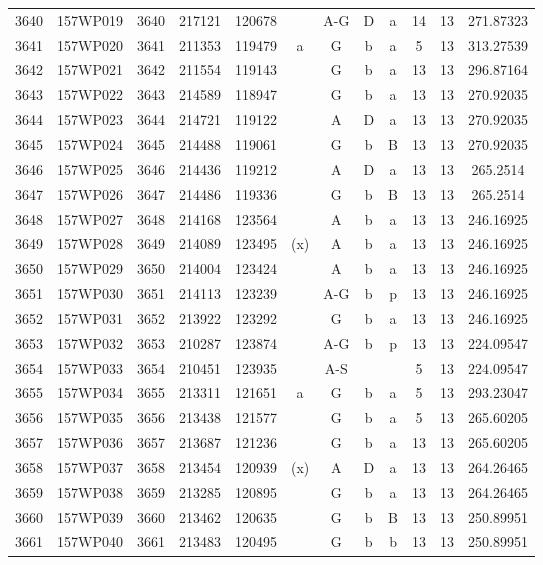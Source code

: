 \begin{tabular}{|*{12}{c|}}
3640 & 157WP019 & 3640 & 217121 & 120678 &  & A-G & D & a & 14 & 13 & 271.87323 \\ 
3641 & 157WP020 & 3641 & 211353 & 119479 & a & G & b & a & 5 & 13 & 313.27539 \\ 
3642 & 157WP021 & 3642 & 211554 & 119143 &  & G & b & a & 13 & 13 & 296.87164 \\ 
3643 & 157WP022 & 3643 & 214589 & 118947 &  & G & b & a & 13 & 13 & 270.92035 \\ 
3644 & 157WP023 & 3644 & 214721 & 119122 &  & A & D & a & 13 & 13 & 270.92035 \\ 
3645 & 157WP024 & 3645 & 214488 & 119061 &  & G & b & B & 13 & 13 & 270.92035 \\ 
3646 & 157WP025 & 3646 & 214436 & 119212 &  & A & D & a & 13 & 13 & 265.2514 \\ 
3647 & 157WP026 & 3647 & 214486 & 119336 &  & G & b & B & 13 & 13 & 265.2514 \\ 
3648 & 157WP027 & 3648 & 214168 & 123564 &  & A & b & a & 13 & 13 & 246.16925 \\ 
3649 & 157WP028 & 3649 & 214089 & 123495 & (x) & A & b & a & 13 & 13 & 246.16925 \\ 
3650 & 157WP029 & 3650 & 214004 & 123424 &  & A & b & a & 13 & 13 & 246.16925 \\ 
3651 & 157WP030 & 3651 & 214113 & 123239 &  & A-G & b & p & 13 & 13 & 246.16925 \\ 
3652 & 157WP031 & 3652 & 213922 & 123292 &  & G & b & a & 13 & 13 & 246.16925 \\ 
3653 & 157WP032 & 3653 & 210287 & 123874 &  & A-G & b & p & 13 & 13 & 224.09547 \\ 
3654 & 157WP033 & 3654 & 210451 & 123935 &  & A-S &  &  & 5 & 13 & 224.09547 \\ 
3655 & 157WP034 & 3655 & 213311 & 121651 & a & G & b & a & 5 & 13 & 293.23047 \\ 
3656 & 157WP035 & 3656 & 213438 & 121577 &  & G & b & a & 5 & 13 & 265.60205 \\ 
3657 & 157WP036 & 3657 & 213687 & 121236 &  & G & b & a & 13 & 13 & 265.60205 \\ 
3658 & 157WP037 & 3658 & 213454 & 120939 & (x) & A & D & a & 13 & 13 & 264.26465 \\ 
3659 & 157WP038 & 3659 & 213285 & 120895 &  & G & b & a & 13 & 13 & 264.26465 \\ 
3660 & 157WP039 & 3660 & 213462 & 120635 &  & G & b & B & 13 & 13 & 250.89951 \\ 
3661 & 157WP040 & 3661 & 213483 & 120495 &  & G & b & b & 13 & 13 & 250.89951 \\ 

\end{tabular}
